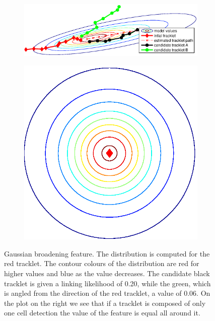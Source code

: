 			\begin{figure}[h]
				\begin{subfigure}{.78\textwidth}
				  \includegraphics[width=\textwidth]{images/fig_gaussianbroadening1}
				\end{subfigure}%
				\hfill
				\begin{subfigure}{.2\textwidth}
				  \includegraphics[width=\textwidth]{images/fig_gaussianbroadening2}
				\end{subfigure}
				\caption{Gaussian broadening feature. The distribution is computed for the red tracklet. The contour colours of the distribution are red for higher values and blue as the value decreases. The candidate black tracklet is given a linking likelihood of 0.20, while the green, which is angled from the direction of the red tracklet, a value of 0.06. On the plot on the right we see that if a tracklet is composed of only one cell detection the value of the feature is equal all around it.}
				\label{fig:gaussianbroadening}
			\end{figure}
			
